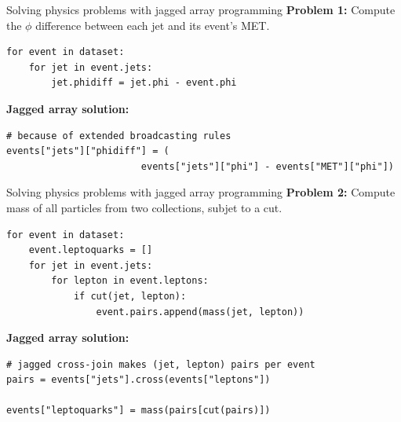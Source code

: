 \documentclass[aspectratio=169]{beamer}
\begin{document}
\begin{frame}[fragile]{Solving physics problems with jagged array programming}
\vspace{0.5 cm}
{\bf Problem 1:} Compute the $\phi$ difference between each jet and its event's MET.
\small
\begin{verbatim}
for event in dataset:
    for jet in event.jets:
        jet.phidiff = jet.phi - event.phi
\end{verbatim}
\normalsize

\vspace{0.5 cm}
{\bf Jagged array solution:} 
\small
\begin{verbatim}
# because of extended broadcasting rules
events["jets"]["phidiff"] = (
                        events["jets"]["phi"] - events["MET"]["phi"])
\end{verbatim}
\end{frame}

\begin{frame}[fragile]{Solving physics problems with jagged array programming}
\vspace{0.5 cm}
{\bf Problem 2:} Compute mass of all particles from two collections, subjet to a cut.
\small
\begin{verbatim}
for event in dataset:
    event.leptoquarks = []
    for jet in event.jets:
        for lepton in event.leptons:
            if cut(jet, lepton):
                event.pairs.append(mass(jet, lepton))
\end{verbatim}
\normalsize

\vspace{0.5 cm}
{\bf Jagged array solution:} 
\small
\begin{verbatim}
# jagged cross-join makes (jet, lepton) pairs per event
pairs = events["jets"].cross(events["leptons"])

events["leptoquarks"] = mass(pairs[cut(pairs)])
\end{verbatim}
\end{frame}
\end{document}

